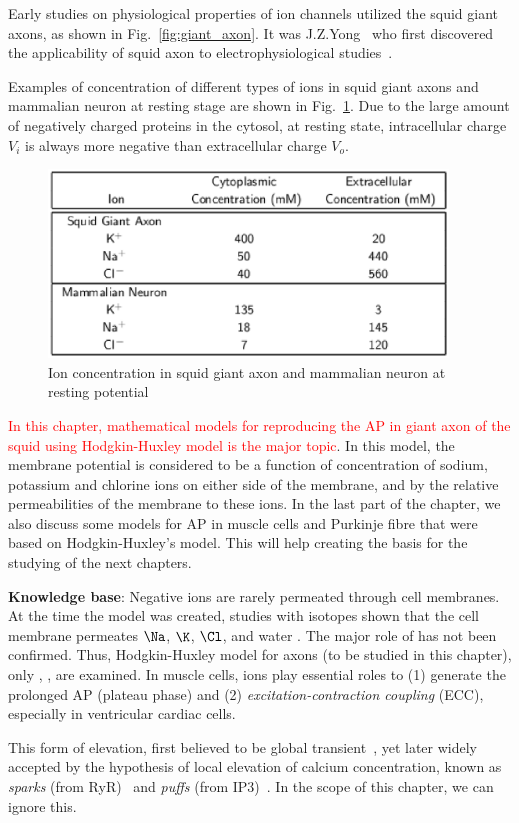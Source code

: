 Early studies on physiological properties of ion channels utilized the squid
giant axons, as shown in Fig.~\ref{fig:giant_axon}. It was J.Z.Yong~ who first
discovered the applicability of squid axon to electrophysiological studies~\citep{young1936}.

Examples of concentration of different types of ions in squid giant axons and
mammalian neuron \citep{gilbert1990} at resting stage are shown in
Fig.~\ref{fig:ion_concentration}.  Due to the large amount of negatively charged
proteins in the cytosol, at resting state, intracellular charge $V_i$ is always
more negative than extracellular charge $V_o$.

\begin{figure}[htb]
  \centerline{\includegraphics[height=5cm]{./images/ion_concentration.eps}}
  \caption{Ion concentration in squid giant axon and mammalian neuron
    at resting potential}\label{fig:ion_concentration}
\end{figure}

\textcolor{red}{In this chapter, mathematical models for reproducing
the AP in giant axon of the squid using Hodgkin-Huxley model is the major
topic}. In this model, the membrane potential is considered to be a function
of concentration of sodium, potassium and chlorine ions on either side of the
membrane, and by the relative permeabilities of the membrane to these ions.
In the last part of the chapter, we also discuss some models for AP in muscle
cells and Purkinje fibre that were based on Hodgkin-Huxley's model. This will
help creating the basis for the studying of the next chapters.

\begin{mdframed}

{\bf Knowledge base}: Negative ions are rarely permeated through
cell membranes. At the time the model was created, studies with isotopes shown
that the cell membrane permeates $\Na$, $\K$, $\Cl$, and water \citep{Leaf1959}.
The major role of  has not been confirmed. Thus, Hodgkin-Huxley model for
axons (to be studied in this chapter), only , ,
 are examined. In muscle cells,  ions play
essential roles to (1) generate the prolonged AP (plateau phase) and
(2) {\it excitation-contraction coupling} (ECC), especially in
ventricular cardiac cells.

This form of elevation, first believed to be global
transient~\citep{fabiato1975cic}, yet later widely accepted by the hypothesis
of local elevation of calcium concentration, known as  {\it sparks}
(from RyR)~\citep{cheng1993cse} and  {\it puffs} (from
IP3)~\citep{parker1991rr}. In the scope of this chapter, we can ignore this.
\end{mdframed}

